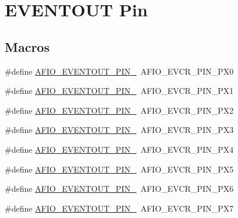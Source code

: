 \hypertarget{group___g_p_i_o_ex___e_v_e_n_t_o_u_t___p_i_n}{}\section{E\+V\+E\+N\+T\+O\+UT Pin}
\label{group___g_p_i_o_ex___e_v_e_n_t_o_u_t___p_i_n}
\subsection*{Macros}
\begin{DoxyCompactItemize}
\item 
\#define \hyperlink{group___g_p_i_o_ex___e_v_e_n_t_o_u_t___p_i_n_ga1caf81a3226da92f477e6fd15cfef16b}{A\+F\+I\+O\+\_\+\+E\+V\+E\+N\+T\+O\+U\+T\+\_\+\+P\+I\+N\+\_}~A\+F\+I\+O\+\_\+\+E\+V\+C\+R\+\_\+\+P\+I\+N\+\_\+\+P\+X0
\item 
\#define \hyperlink{group___g_p_i_o_ex___e_v_e_n_t_o_u_t___p_i_n_gae2d151889f9f4b65ce6547aa80dca582}{A\+F\+I\+O\+\_\+\+E\+V\+E\+N\+T\+O\+U\+T\+\_\+\+P\+I\+N\+\_}~A\+F\+I\+O\+\_\+\+E\+V\+C\+R\+\_\+\+P\+I\+N\+\_\+\+P\+X1
\item 
\#define \hyperlink{group___g_p_i_o_ex___e_v_e_n_t_o_u_t___p_i_n_ga20d5efc2e37b380ba6acab899fac25ec}{A\+F\+I\+O\+\_\+\+E\+V\+E\+N\+T\+O\+U\+T\+\_\+\+P\+I\+N\+\_}~A\+F\+I\+O\+\_\+\+E\+V\+C\+R\+\_\+\+P\+I\+N\+\_\+\+P\+X2
\item 
\#define \hyperlink{group___g_p_i_o_ex___e_v_e_n_t_o_u_t___p_i_n_gac6eb85f0eff1513ba213dc9d1c0af35b}{A\+F\+I\+O\+\_\+\+E\+V\+E\+N\+T\+O\+U\+T\+\_\+\+P\+I\+N\+\_}~A\+F\+I\+O\+\_\+\+E\+V\+C\+R\+\_\+\+P\+I\+N\+\_\+\+P\+X3
\item 
\#define \hyperlink{group___g_p_i_o_ex___e_v_e_n_t_o_u_t___p_i_n_gaa2a1db689ed0a7b46f5ed773a2e54d54}{A\+F\+I\+O\+\_\+\+E\+V\+E\+N\+T\+O\+U\+T\+\_\+\+P\+I\+N\+\_}~A\+F\+I\+O\+\_\+\+E\+V\+C\+R\+\_\+\+P\+I\+N\+\_\+\+P\+X4
\item 
\#define \hyperlink{group___g_p_i_o_ex___e_v_e_n_t_o_u_t___p_i_n_gaa96afd6502080bd3d6cd68e6e06e7bfa}{A\+F\+I\+O\+\_\+\+E\+V\+E\+N\+T\+O\+U\+T\+\_\+\+P\+I\+N\+\_}~A\+F\+I\+O\+\_\+\+E\+V\+C\+R\+\_\+\+P\+I\+N\+\_\+\+P\+X5
\item 
\#define \hyperlink{group___g_p_i_o_ex___e_v_e_n_t_o_u_t___p_i_n_gae9b4ddb2c1bd1c343d396983148f1522}{A\+F\+I\+O\+\_\+\+E\+V\+E\+N\+T\+O\+U\+T\+\_\+\+P\+I\+N\+\_}~A\+F\+I\+O\+\_\+\+E\+V\+C\+R\+\_\+\+P\+I\+N\+\_\+\+P\+X6
\item 
\#define \hyperlink{group___g_p_i_o_ex___e_v_e_n_t_o_u_t___p_i_n_ga999cd9c3ce9821b73e7610f11da7258f}{A\+F\+I\+O\+\_\+\+E\+V\+E\+N\+T\+O\+U\+T\+\_\+\+P\+I\+N\+\_}~A\+F\+I\+O\+\_\+\+E\+V\+C\+R\+\_\+\+P\+I\+N\+\_\+\+P\+X7

\end{DoxyCompactItemize}
